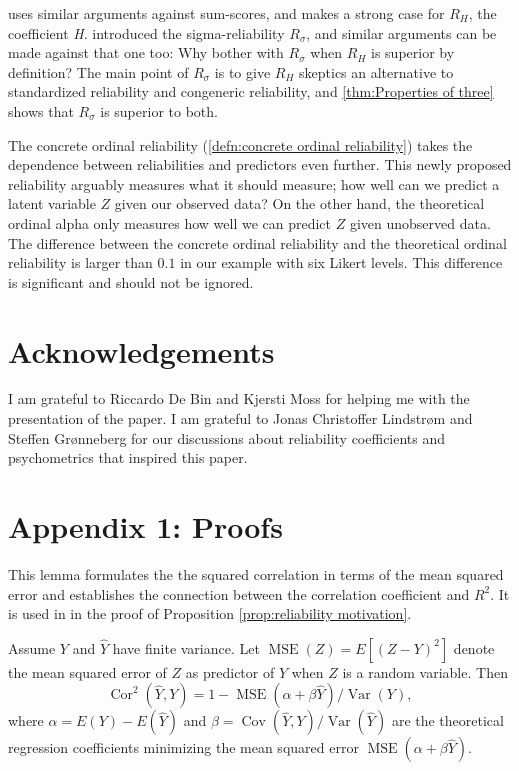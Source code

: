 \documentclass[twoside]{article}
\DeclareMathOperator{\Var}{Var}
\DeclareMathOperator{\Cor}{Cor}
\DeclareMathOperator{\Cov}{Cov}
\DeclareMathOperator{\MSE}{MSE}
\begin{document}
\citet{McNeish2019-ea} uses similar arguments against sum-scores, and makes a strong case for $ R_H$, the coefficient \textit{H}.  introduced the sigma-reliability $ R_\sigma$, and similar arguments can be made against that one too: Why bother with $ R_\sigma$ when $ R_H$ is superior by definition? The main point of $ R_\sigma$ is to give $ R_H$ skeptics an alternative to standardized reliability and congeneric reliability, and \cref{thm:Properties of three} shows that $ R_\sigma$ is superior to both. 

The concrete ordinal reliability (\cref{defn:concrete ordinal reliability}) takes the dependence between reliabilities and predictors even further. This newly proposed reliability arguably measures what it should measure; how well can we predict a latent variable $Z$ given our observed data? On the other hand, the theoretical ordinal alpha only measures how well we can predict $Z$ given unobserved data. The difference between the concrete ordinal reliability and the theoretical ordinal reliability is larger than $0.1$ in our example with six Likert levels. This difference is significant and should not be ignored.

\section{Acknowledgements}
I am grateful to Riccardo De Bin and Kjersti Moss for helping me with the presentation of the paper. I am grateful to Jonas Christoffer Lindstrøm and Steffen Grønneberg for our discussions about reliability coefficients and psychometrics that inspired this paper.

\clearpage
\section*{Appendix 1: Proofs}
\label{Appendix 1}

This lemma formulates the the squared correlation in terms of the mean squared error and establishes the connection between the correlation coefficient and $R^2$. It is used in in the proof of Proposition \ref{prop:reliability motivation}. 
\begin{lem}
\label{lem:r^2 and correlation}Assume $Y$ and $\hat{Y}$ have finite
variance. Let $\MSE(Z) = E[(Z-Y)^2]$ denote the mean squared error of $Z$ as predictor of $Y$ when $Z$ is a random variable. Then 
\begin{equation}
\Cor^{2}(\hat{Y},Y)=1-\MSE(\alpha+\beta\hat{Y})/\Var(Y),\label{eq:rsq and correlation}
\end{equation}
where $\alpha=E(Y)-E(\hat{Y})$ and $\beta=\Cov(\hat{Y},Y)/\Var(\hat{Y})$ are the theoretical regression coefficients minimizing the mean squared error $\MSE(\alpha+\beta\hat{Y})$. 
\end{lem}
\end{document}
